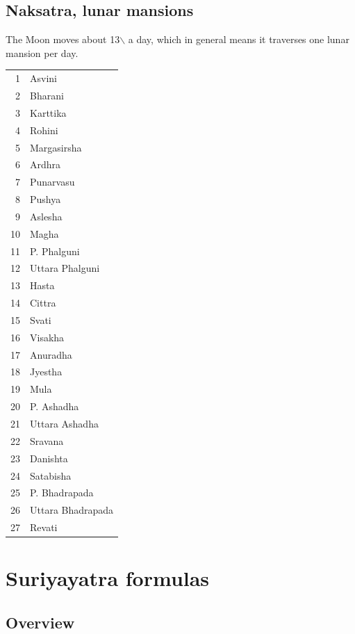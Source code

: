 \documentclass[11pt,oneside]{memoir-article}
\begin{document}
\section{Naksatra, lunar mansions}
\label{sec-4-3}


The Moon moves about 13\degree$\backslash$ a day, which in general means it traverses one
lunar mansion per day.


\begin{center}
\begin{tabular}{rl}
1 & Asvini\\
2 & Bharani\\
3 & Karttika\\
4 & Rohini\\
5 & Margasirsha\\
6 & Ardhra\\
7 & Punarvasu\\
8 & Pushya\\
9 & Aslesha\\
10 & Magha\\
11 & P. Phalguni\\
12 & Uttara Phalguni\\
13 & Hasta\\
14 & Cittra\\
15 & Svati\\
16 & Visakha\\
17 & Anuradha\\
18 & Jyestha\\
19 & Mula\\
20 & P. Ashadha\\
21 & Uttara Ashadha\\
22 & Sravana\\
23 & Danishta\\
24 & Satabisha\\
25 & P. Bhadrapada\\
26 & Uttara Bhadrapada\\
27 & Revati\\
\end{tabular}
\end{center}

\clearpage

\chapter{Suriyayatra formulas}
\label{sec-5}
\label{suriyayatra-formulas}
\section{Overview}
\label{sec-5-1}
\end{document}
